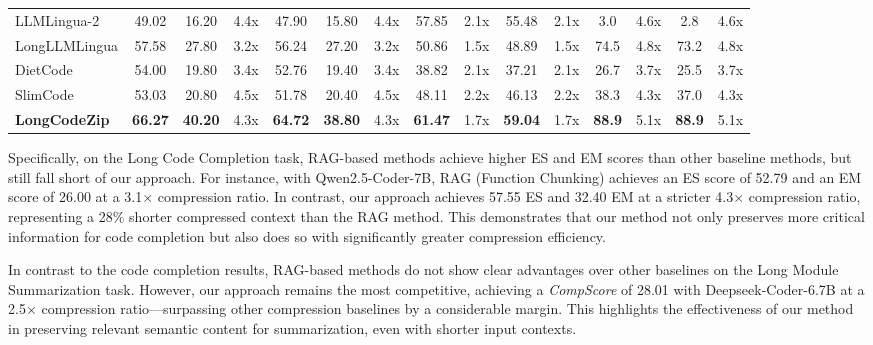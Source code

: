 \documentclass[10pt,conference]{IEEEtran}
\newcommand{\approach}{{LongCodeZip}\xspace} %
\begin{document}
\begin{table}[t]
\begin{threeparttable}
{\begin{tabular}{l|ccc|ccc|cc|cc|cc|cc}
    LLMLingua-2 & 49.02 & 16.20 & 4.4x & 47.90 & 15.80 & 4.4x & 57.85 & 2.1x & 55.48 & 2.1x & 3.0 & 4.6x & 2.8 & 4.6x \\
    LongLLMLingua & 57.58 & 27.80 & 3.2x & 56.24 & 27.20 & 3.2x & 50.86 & 1.5x & 48.89 & 1.5x & 74.5 & 4.8x & 73.2 & 4.8x \\
    DietCode & 54.00 & 19.80 & 3.4x & 52.76 & 19.40 & 3.4x & 38.82 & 2.1x & 37.21 & 2.1x & 26.7 & 3.7x & 25.5 & 3.7x \\
    SlimCode & 53.03 & 20.80 & 4.5x & 51.78 & 20.40 & 4.5x & 48.11 & 2.2x & 46.13 & 2.2x & 38.3 & 4.3x & 37.0 & 4.3x \\
    \cmidrule(lr){1-15}
    \cellcolor{cyan!10}\textbf{\approach} & \cellcolor{cyan!10}\textbf{66.27} & \cellcolor{cyan!10}\textbf{40.20} & \cellcolor{cyan!10}4.3x & \cellcolor{cyan!10}\textbf{64.72} & \cellcolor{cyan!10}\textbf{38.80} & \cellcolor{cyan!10}4.3x & \cellcolor{cyan!10}\textbf{61.47} & \cellcolor{cyan!10}1.7x & \cellcolor{cyan!10}\textbf{59.04} & \cellcolor{cyan!10}1.7x & \cellcolor{cyan!10}\textbf{88.9} & \cellcolor{cyan!10}5.1x & \cellcolor{cyan!10}\textbf{88.9} & \cellcolor{cyan!10}5.1x \\
    \bottomrule
    \end{tabular}
    }
    \end{threeparttable}
    \vspace{-0.25cm}
\end{table}

Specifically, on the Long Code Completion task, RAG-based methods achieve higher ES and EM scores than other baseline methods, but still fall short of our approach. For instance, with Qwen2.5-Coder-7B, RAG (Function Chunking) achieves an ES score of 52.79 and an EM score of 26.00 at a 3.1$\times$ compression ratio. In contrast, our approach achieves 57.55 ES and 32.40 EM at a stricter 4.3$\times$ compression ratio, representing a 28\% shorter compressed context than the RAG method. This demonstrates that our method not only preserves more critical information for code completion but also does so with significantly greater compression efficiency.

In contrast to the code completion results, RAG-based methods do not show clear advantages over other baselines on the Long Module Summarization task. However, our approach remains the most competitive, achieving a \textit{CompScore} of 28.01 with Deepseek-Coder-6.7B at a 2.5$\times$ compression ratio—surpassing other compression baselines by a considerable margin. 
This highlights the effectiveness of our method in preserving relevant semantic content for summarization, even with shorter input contexts.
\end{document}
